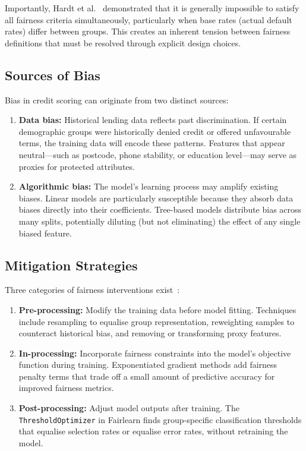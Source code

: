 Importantly, Hardt et al.~\cite{hardt2016} demonstrated that it is generally impossible to satisfy all fairness criteria simultaneously, particularly when base rates (actual default rates) differ between groups. This creates an inherent tension between fairness definitions that must be resolved through explicit design choices.

\subsection{Sources of Bias}

Bias in credit scoring can originate from two distinct sources:

\begin{enumerate}
    \item \textbf{Data bias:} Historical lending data reflects past discrimination. If certain demographic groups were historically denied credit or offered unfavourable terms, the training data will encode these patterns. Features that appear neutral---such as postcode, phone stability, or education level---may serve as proxies for protected attributes.
    \item \textbf{Algorithmic bias:} The model's learning process may amplify existing biases. Linear models are particularly susceptible because they absorb data biases directly into their coefficients. Tree-based models distribute bias across many splits, potentially diluting (but not eliminating) the effect of any single biased feature.
\end{enumerate}

\subsection{Mitigation Strategies}

Three categories of fairness interventions exist~\cite{bird2020}:

\begin{enumerate}
    \item \textbf{Pre-processing:} Modify the training data before model fitting. Techniques include resampling to equalise group representation, reweighting samples to counteract historical bias, and removing or transforming proxy features.
    \item \textbf{In-processing:} Incorporate fairness constraints into the model's objective function during training. Exponentiated gradient methods add fairness penalty terms that trade off a small amount of predictive accuracy for improved fairness metrics.
    \item \textbf{Post-processing:} Adjust model outputs after training. The \texttt{ThresholdOptimizer} in Fairlearn finds group-specific classification thresholds that equalise selection rates or equalise error rates, without retraining the model.
\end{enumerate}

